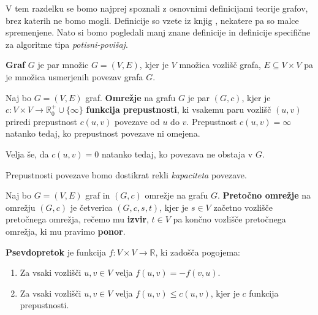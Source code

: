 \documentclass[mat1]{fmfdelo}
\begin{document}
V tem razdelku se bomo najprej spoznali z osnovnimi definicijami teorije grafov, brez katerih ne bomo mogli. Definicije so vzete iz knjig \cite{clrs, uvtg}, nekatere pa so malce spremenjene. Nato si bomo pogledali manj znane definicije in definicije specifične za algoritme tipa \textit{potisni-povišaj}.

\begin{definicija}
\textbf{Graf} $G$ je par množic $G = (V,E)$, kjer je $V$ množica vozlišč grafa, $E \subseteq V \times V$ pa je množica usmerjenih povezav grafa $G$.
\end{definicija}

\begin{definicija}\label{def:omrezjeprepustnost}
Naj bo $G = (V, E)$ graf. \textbf{Omrežje} na grafu $G$ je par $(G, c)$, kjer je $c \colon V \times V \rightarrow \mathbb{R}^+_0 \cup \{\infty\}$ \textbf{funkcija prepustnosti}, ki vsakemu paru vozlišč $(u,v)$ priredi prepustnost $c(u,v)$ povezave od $u$ do $v$. Prepustnost $c(u,v) = \infty$ natanko tedaj, ko prepustnost povezave ni omejena.

Velja še, da $c(u,v)=0$ natanko tedaj, ko povezava ne obstaja v $G$.
\end{definicija}

\begin{opomba}
Prepustnosti povezave bomo dostikrat rekli \textit{kapaciteta} povezave.
\end{opomba}

\begin{definicija}
Naj bo $G = (V,E)$ graf in $(G,c)$ omrežje na grafu $G$. \textbf{Pretočno omrežje} na omrežju $(G,c)$ je četverica $(G,c,s,t)$, kjer je $s\in V$ začetno vozlišče pretočnega omrežja, rečemo mu \textbf{izvir}, $t\in V$ pa končno vozlišče pretočnega omrežja, ki mu pravimo \textbf{ponor}.
\end{definicija}

\begin{definicija} \label{def:psevdopretok}
\textbf{Psevdopretok} je funkcija $f \colon V \times V \rightarrow \mathbb{R}$, ki zadošča pogojema:
\begin{enumerate}
\item Za vsaki vozlišči $u,v \in V$ velja $f(u,v) = - f(v,u)$.
\item Za vsaki vozlišči $u,v \in V$ velja $f(u,v) \leq c(u,v)$, kjer je $c$ funkcija pre\-pu\-stno\-sti.
\end{enumerate}
\end{definicija}
\end{document}
